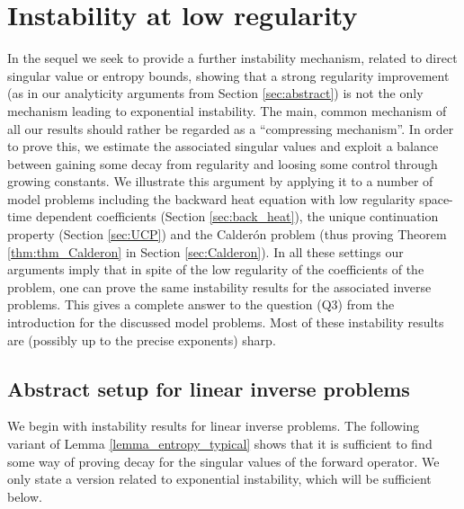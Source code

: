 \documentclass[12pt,twoside]{amsart}
\numberwithin{equation}{section}
\begin{document}
\section{Instability at low regularity}
\label{sec:instab_low_reg}

In the sequel we seek to provide a further instability mechanism, related to direct singular value or entropy bounds, showing that a strong regularity improvement (as in our analyticity arguments from Section \ref{sec:abstract}) is not the only mechanism leading to exponential instability. The main, common mechanism of all our results should rather be regarded as a ``compressing mechanism''. In order to prove this, we estimate the associated singular values and exploit a balance between gaining some decay from regularity and loosing some control through growing constants. We illustrate this argument by applying it to a number of model problems including the backward heat equation with low regularity space-time dependent coefficients (Section \ref{sec:back_heat}), the unique continuation property (Section \ref{sec:UCP}) and the Calder\'on problem (thus proving Theorem \ref{thm:thm_Calderon} in Section \ref{sec:Calderon}). In all these settings our arguments imply that in spite of the low regularity of the coefficients of the problem, one can prove the same instability results for
the associated inverse problems. This gives a complete answer to the question (Q3) from the introduction for the discussed model problems. Most of these instability results are (possibly up to the precise exponents) sharp.



\subsection{Abstract setup for linear inverse problems}

We begin with instability results for linear inverse problems. The following variant of Lemma \ref{lemma_entropy_typical} shows that it is sufficient to find some way of proving decay for the singular values of the forward operator. We only state a version related to exponential instability, which will be sufficient below.
\end{document}
